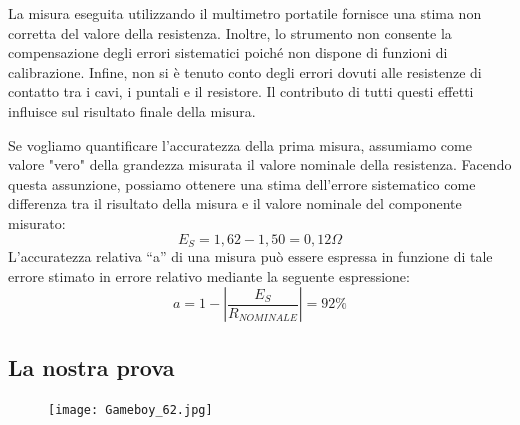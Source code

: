 \vspace{5mm}
La misura eseguita utilizzando il multimetro portatile fornisce una stima non corretta del valore della resistenza. Inoltre, lo strumento non consente la compensazione degli errori sistematici poiché non dispone di funzioni di calibrazione. Infine, non si è tenuto conto degli errori dovuti alle resistenze di contatto tra i cavi, i puntali e il resistore. Il contributo di tutti questi effetti influisce sul risultato finale della misura.

Se vogliamo quantificare l'accuratezza della prima misura, assumiamo come valore "vero" della grandezza misurata il valore nominale della resistenza. Facendo questa assunzione, possiamo ottenere una stima dell'errore sistematico come differenza tra il risultato della misura e il valore nominale del componente misurato:
\begin{equation}
    E_S = 1,62 - 1,50 = 0,12\Omega
\end{equation}
L’accuratezza relativa “a” di una misura può essere espressa in funzione di tale errore 
stimato in errore relativo mediante la seguente espressione: 
\begin{equation}
     a = 1 - \left| \frac{E_S}{R_{NOMINALE}}\right| = 92\%
\end{equation}
\clearpage

\subsection*{La nostra prova}
\label{sub:nosta_prova_first}

\vspace{0.5cm}
\FloatBarrier
\begin{figure}
    \centering
    \texttt{[image: Gameboy\_62.jpg]}
    \label{fig:mult_port_nostro}
\end{figure}
\FloatBarrier
    
